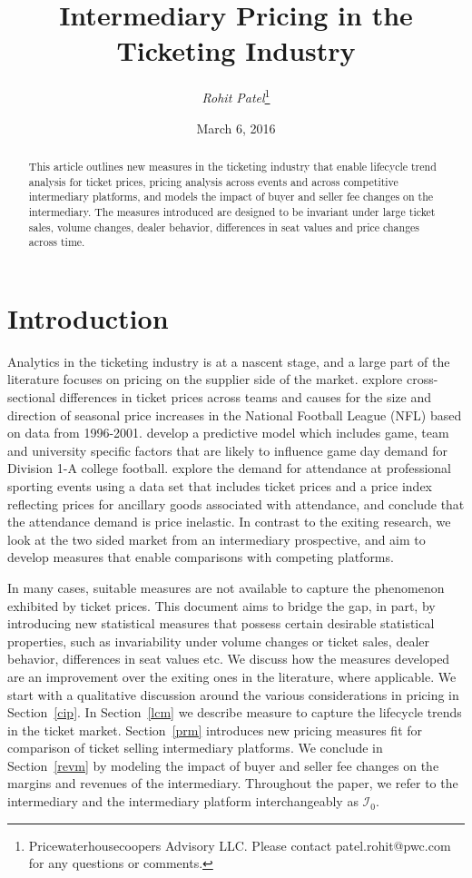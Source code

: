 \documentclass[letterpaper, 12pt]{article}
\begin{document}
\title{Intermediary Pricing in the Ticketing Industry}
\author{\emph{Rohit Patel}\thanks{Pricewaterhousecoopers Advisory LLC. Please contact patel.rohit@pwc.com for any questions or comments.}}
\date {March 6, 2016}
\maketitle
\begin{abstract} This article outlines new measures in the ticketing industry that enable lifecycle trend analysis for ticket prices, pricing analysis across events and across competitive intermediary platforms, and models the impact of buyer and seller fee changes on the intermediary. The measures introduced are designed to be invariant under large ticket sales, volume changes, dealer behavior, differences in seat values and price changes across time.
\end{abstract}

\section{Introduction}
Analytics in the ticketing industry is at a nascent stage, and a large part of the literature focuses on pricing on the supplier side of the market. \cite{rishe2003ticket} explore cross-sectional differences in ticket prices across teams and causes for the size and direction of seasonal price increases in the National Football League (NFL) based on data from 1996-2001. \cite{price2003demand} develop a predictive model which includes game, team and university specific factors that are likely to influence game day demand for Division 1-A college football. \cite{coates2007ticket} explore the demand for attendance at professional sporting events using a data set that includes ticket prices and a price index reflecting prices for ancillary goods associated with attendance, and conclude that the attendance demand is price inelastic. In contrast to the exiting research, we look at the two sided market from an intermediary prospective, and aim to develop measures that enable comparisons with competing platforms. 

In many cases, suitable measures are not available to capture the phenomenon exhibited by ticket prices. This document aims to bridge the gap, in part, by introducing new statistical measures that possess certain desirable statistical properties, such as invariability under volume changes or ticket sales, dealer behavior, differences in seat values etc. We discuss how the measures developed are an improvement over the exiting ones in the literature, where applicable. We start with a qualitative discussion around the various considerations in pricing in Section~\ref{cip}. In Section~\ref{lcm} we describe measure to capture the lifecycle trends in the ticket market. Section~\ref{prm} introduces new pricing measures fit for comparison of ticket selling intermediary platforms. We conclude in Section~\ref{revm} by modeling the impact of buyer and seller fee changes on the margins and revenues of the intermediary. Throughout the paper, we refer to the intermediary and the intermediary platform interchangeably as $\mathcal{I}_0$.
\end{document}
